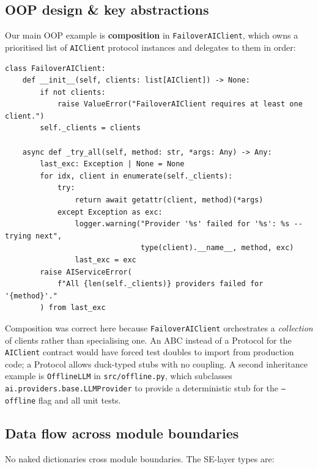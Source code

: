 \documentclass[11pt,a4paper]{article}
\begin{document}
\subsection{OOP design \& key abstractions}

Our main OOP example is \textbf{composition} in \texttt{FailoverAIClient}, which owns a prioritised list of \texttt{AIClient} protocol instances and delegates to them in order:

\begin{lstlisting}[style=python]
class FailoverAIClient:
    def __init__(self, clients: list[AIClient]) -> None:
        if not clients:
            raise ValueError("FailoverAIClient requires at least one client.")
        self._clients = clients

    async def _try_all(self, method: str, *args: Any) -> Any:
        last_exc: Exception | None = None
        for idx, client in enumerate(self._clients):
            try:
                return await getattr(client, method)(*args)
            except Exception as exc:
                logger.warning("Provider '%s' failed for '%s': %s -- trying next",
                               type(client).__name__, method, exc)
                last_exc = exc
        raise AIServiceError(
            f"All {len(self._clients)} providers failed for '{method}'."
        ) from last_exc
\end{lstlisting}

Composition was correct here because \texttt{FailoverAIClient} orchestrates a \emph{collection} of clients rather than specialising one. An ABC instead of a Protocol for the \texttt{AIClient} contract would have forced test doubles to import from production code; a Protocol allows duck-typed stubs with no coupling. A second inheritance example is \texttt{OfflineLLM} in \texttt{src/offline.py}, which subclasses \texttt{ai.providers.base.LLMProvider} to provide a deterministic stub for the \texttt{--offline} flag and all unit tests.

\subsection{Data flow across module boundaries}

No naked dictionaries cross module boundaries. The SE-layer types are:
\end{document}
